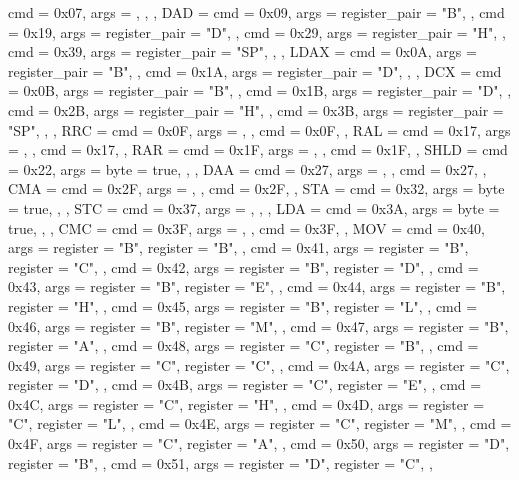 {{        { cmd = 0x07, args = {}, },
    },
    DAD  = {
        { cmd = 0x09, args = {{register_pair = "B"}}, },
        { cmd = 0x19, args = {{register_pair = "D"}}, },
        { cmd = 0x29, args = {{register_pair = "H"}}, },
        { cmd = 0x39, args = {{register_pair = "SP"}}, },
    },
    LDAX = {
        { cmd = 0x0A, args = {{register_pair = "B"}}, },
        { cmd = 0x1A, args = {{register_pair = "D"}}, },
    },
    DCX  = {
        { cmd = 0x0B, args = {{register_pair = "B"}}, },
        { cmd = 0x1B, args = {{register_pair = "D"}}, },
        { cmd = 0x2B, args = {{register_pair = "H"}}, },
        { cmd = 0x3B, args = {{register_pair = "SP"}}, },
    },
    RRC  = {
        { cmd = 0x0F, args = {}, },
        cmd = 0x0F,
    },
    RAL  = {
        { cmd = 0x17, args = {}, },
        cmd = 0x17,
    },
    RAR  = {
        { cmd = 0x1F, args = {}, },
        cmd = 0x1F,
    },
    SHLD = {
        { cmd = 0x22, args = {{byte = true}}, },
    },
    DAA  = {
        { cmd = 0x27, args = {}, },
        cmd = 0x27,
    },
    CMA  = {
        { cmd = 0x2F, args = {}, },
        cmd = 0x2F,
    },
    STA  = {
        { cmd = 0x32, args = {{byte = true}}, },
    },
    STC  = {
        { cmd = 0x37, args = {}, },
    },
    LDA  = {
        { cmd = 0x3A, args = {{byte = true}}, },
    },
    CMC  = {
        { cmd = 0x3F, args = {}, },
        cmd = 0x3F,
    },
    MOV  = {
        { cmd = 0x40, args = {{register = "B"}, {register = "B"}}, },
        { cmd = 0x41, args = {{register = "B"}, {register = "C"}}, },
        { cmd = 0x42, args = {{register = "B"}, {register = "D"}}, },
        { cmd = 0x43, args = {{register = "B"}, {register = "E"}}, },
        { cmd = 0x44, args = {{register = "B"}, {register = "H"}}, },
        { cmd = 0x45, args = {{register = "B"}, {register = "L"}}, },
        { cmd = 0x46, args = {{register = "B"}, {register = "M"}}, },
        { cmd = 0x47, args = {{register = "B"}, {register = "A"}}, },
        { cmd = 0x48, args = {{register = "C"}, {register = "B"}}, },
        { cmd = 0x49, args = {{register = "C"}, {register = "C"}}, },
        { cmd = 0x4A, args = {{register = "C"}, {register = "D"}}, },
        { cmd = 0x4B, args = {{register = "C"}, {register = "E"}}, },
        { cmd = 0x4C, args = {{register = "C"}, {register = "H"}}, },
        { cmd = 0x4D, args = {{register = "C"}, {register = "L"}}, },
        { cmd = 0x4E, args = {{register = "C"}, {register = "M"}}, },
        { cmd = 0x4F, args = {{register = "C"}, {register = "A"}}, },
        { cmd = 0x50, args = {{register = "D"}, {register = "B"}}, },
        { cmd = 0x51, args = {{register = "D"}, {register = "C"}}, },
}}
